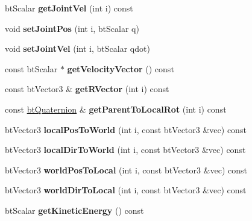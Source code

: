 \begin{DoxyCompactItemize}
bt\+Scalar {\bfseries get\+Joint\+Vel} (int i) const
\item 
\mbox{\label{classbtMultiBody_aad8bd57ac6615edfc1a50502d9cb78c2}} 
void {\bfseries set\+Joint\+Pos} (int i, bt\+Scalar q)
\item 
\mbox{\label{classbtMultiBody_a8c16a6fdd585bfb3759757f4fe80f16a}} 
void {\bfseries set\+Joint\+Vel} (int i, bt\+Scalar qdot)
\item 
\mbox{\label{classbtMultiBody_abc072b33c2616cb5b61345a4f0cf0b44}} 
const bt\+Scalar $\ast$ {\bfseries get\+Velocity\+Vector} () const
\item 
\mbox{\label{classbtMultiBody_a687b2bf25263cd47c2a2f4326ed959b1}} 
const bt\+Vector3 \& {\bfseries get\+R\+Vector} (int i) const
\item 
\mbox{\label{classbtMultiBody_ae42e5e37f50d1b9a9bf0e14e61efa9b5}} 
const \hyperlink{classbtQuaternion}{bt\+Quaternion} \& {\bfseries get\+Parent\+To\+Local\+Rot} (int i) const
\item 
\mbox{\label{classbtMultiBody_a3679bf96983455fe706670d6c57b013a}} 
bt\+Vector3 {\bfseries local\+Pos\+To\+World} (int i, const bt\+Vector3 \&vec) const
\item 
\mbox{\label{classbtMultiBody_abac00bae508109a169beb605de462012}} 
bt\+Vector3 {\bfseries local\+Dir\+To\+World} (int i, const bt\+Vector3 \&vec) const
\item 
\mbox{\label{classbtMultiBody_af3ea3389096463994058688eebfdd596}} 
bt\+Vector3 {\bfseries world\+Pos\+To\+Local} (int i, const bt\+Vector3 \&vec) const
\item 
\mbox{\label{classbtMultiBody_a6c922a1a02409d8790f00c58019b1f41}} 
bt\+Vector3 {\bfseries world\+Dir\+To\+Local} (int i, const bt\+Vector3 \&vec) const
\item 
\mbox{\label{classbtMultiBody_a42a042eba0b18e4f0d8b868d6dc23e8b}} 
bt\+Scalar {\bfseries get\+Kinetic\+Energy} () const
\item 

\end{DoxyCompactItemize}
